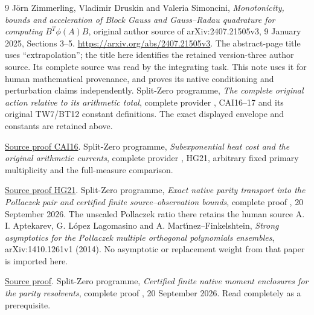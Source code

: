 \documentclass[11pt]{article}
\begin{document}
\begin{thebibliography}{9}
 J\"orn Zimmerling, Vladimir Druskin and Valeria Simoncini,
\emph{Monotonicity, bounds and acceleration of Block Gauss and
Gauss--Radau quadrature for computing $B^T\phi(A)B$}, original
author source of arXiv:2407.21505v3, 9 January 2025, Sections 3--5.
\url{https://arxiv.org/abs/2407.21505v3}.
The abstract-page title uses ``extrapolation''; the title here
identifies the retained version-three author source. Its complete
source was read by the integrating task. This note uses it for
human mathematical provenance, and proves its native conditioning
and perturbation claims independently.
 Split-Zero programme, \emph{The complete original action
relative to its arithmetic total}, complete provider
, CAI16--17 and its original
TW7/BT12 constant definitions. The exact displayed envelope and
constants are retained above.

\href{https://github.com/KokunoYumeto/zeta-function-research-reader/blob/487253b5b01851da5b9b98af4e146fecf1fab902/workbenches/splitzero-tandem/continuations/20260919-full-window-source-products/providers/CAI_COMPLETE_PREREQUISITE.tex\#L284}{Source proof CAI16}.
 Split-Zero programme, \emph{Subexponential heat cost and
the original arithmetic currents}, complete provider
, HG21, arbitrary
fixed primary multiplicity and the full-measure comparison.

\href{https://github.com/KokunoYumeto/zeta-function-research-reader/blob/5992ad50c0f2a06921f1fcaded7b4e38097c0739/workbenches/splitzero-tandem/continuations/20260920-original-kernel-mixed-determinants/providers/HEAT_GROWTH_AND_ORIGINAL_CURRENTS.tex\#L374}{Source proof HG21}.
 Split-Zero programme, \emph{Exact native parity transport
into the Pollaczek pair and certified finite source--observation
bounds}, complete proof
,
20 September 2026. The unscaled Pollaczek ratio there retains the
human source A. I. Aptekarev, G. L\'opez Lagomasino and
A. Mart\'{\i}nez--Finkelshtein, \emph{Strong asymptotics for the
Pollaczek multiple orthogonal polynomials ensembles},
arXiv:1410.1261v1 (2014). No asymptotic or replacement weight from
that paper is imported here.

\href{https://github.com/KokunoYumeto/zeta-function-research-reader/blob/5992ad50c0f2a06921f1fcaded7b4e38097c0739/workbenches/splitzero-tandem/continuations/20260920-original-kernel-mixed-determinants/providers/PARITY_POLLACZEK_NATIVE_RECEIVER.tex\#L1}{Source proof}.
 Split-Zero programme, \emph{Certified finite native moment
enclosures for the parity resolvents}, complete proof
,
20 September 2026. Read completely as a prerequisite.


\end{thebibliography}
\end{document}
